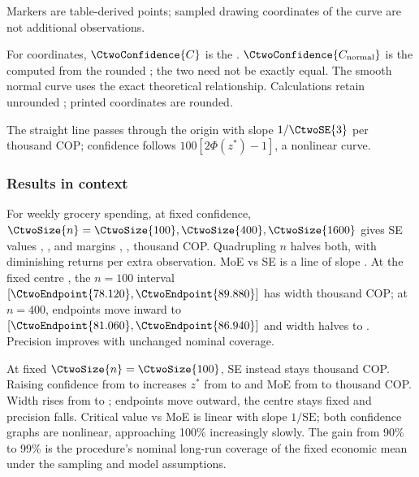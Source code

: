 \begin{landscape}
\begin{minipage}{\linewidth}
\begin{minipage}[t]{.43\linewidth}
Markers are table-derived points; sampled drawing coordinates of the curve are not additional observations.

For  coordinates, $\CtwoConfidence{C}$ is the . $\CtwoConfidence{C_{\rm normal}}$ is the  computed from the rounded ; the two need not be exactly equal. The smooth normal curve uses the exact theoretical relationship. Calculations retain unrounded ; printed coordinates are rounded.
\end{minipage}
\end{minipage}
\par\medskip

The straight line passes through the origin with slope $1/\CtwoSE{3}$ per thousand COP; confidence follows $100[2\Phi(z^*)-1]$, a nonlinear curve.

\end{landscape}
\clearpage
{}
\subsubsection*{Results in context}
For weekly grocery spending, at fixed  confidence, $\CtwoSize{n}=\CtwoSize{100},\CtwoSize{400},\CtwoSize{1600}$ gives SE values , ,  and margins , ,  thousand COP. Quadrupling $n$ halves both, with diminishing returns per extra observation. MoE vs SE is a line of slope . At the fixed centre , the $n=100$ interval $[\CtwoEndpoint{78.120},\CtwoEndpoint{89.880}]$ has width  thousand COP; at $n=400$, endpoints move inward to $[\CtwoEndpoint{81.060},\CtwoEndpoint{86.940}]$ and width halves to . Precision improves with unchanged nominal coverage.

At fixed $\CtwoSize{n}=\CtwoSize{100}$, SE instead stays  thousand COP. Raising confidence from  to  increases $z^*$ from  to  and MoE from  to  thousand COP. Width rises from  to ; endpoints move outward, the centre stays fixed and precision falls. Critical value vs MoE is linear with slope $1/\mathrm{SE}$; both confidence graphs are nonlinear, approaching 100\% increasingly slowly. The gain from 90\% to 99\% is the procedure's nominal long-run coverage of the fixed economic mean under the sampling and model assumptions.
\clearpage
